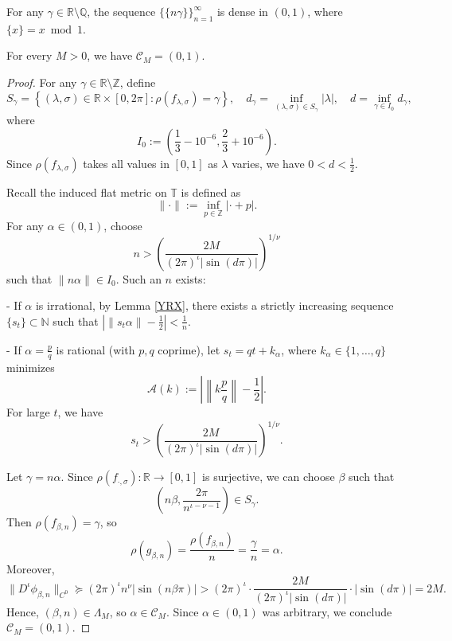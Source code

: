 \documentclass[10pt,a4paper]{amsart}
\begin{document}
\begin{Lemma} \label{YRX}
For any $\gamma \in \mathbb{R} \setminus \mathbb{Q}$, the sequence $\{\{n\gamma\}\}_{n=1}^{\infty}$ is dense in $(0,1)$, where $\{x\} = x \bmod 1$.
\end{Lemma}

\begin{Proposition} \label{DW}
For every \( M > 0 \), we have \( \mathcal{C}_M = (0,1) \).
\end{Proposition}

\begin{proof}
For any \( \gamma \in \mathbb{R} \setminus \mathbb{Z} \), define
\[
S_\gamma = \left\{ (\lambda, \sigma) \in \mathbb{R} \times [0, 2\pi] : \rho(f_{\lambda,\sigma}) = \gamma \right\}, \quad
d_\gamma = \inf_{(\lambda,\sigma) \in S_\gamma} |\lambda|, \quad
d = \inf_{\gamma \in I_0} d_\gamma,
\]
where
\[
I_0 := \left(\frac{1}{3} - 10^{-6}, \frac{2}{3} + 10^{-6}\right).
\]
Since $\rho(f_{\lambda,\sigma})$ takes all values in $[0,1]$ as $\lambda$ varies, we have \( 0 < d < \frac{1}{2} \).

Recall the induced flat metric on \( \mathbb{T} \) is defined as
\[
\|\cdot\| := \inf_{p \in \mathbb{Z}} |\cdot + p|.
\]
For any \( \alpha \in (0,1) \), choose
\[
n > \left( \frac{2M}{(2\pi)^{\iota} |\sin(d\pi)|} \right)^{1/\nu}
\]
such that $\|n\alpha\| \in I_0$. Such an \( n \) exists:

- If \( \alpha \) is irrational, by Lemma \ref{YRX}, there exists a strictly increasing sequence \( \{s_t\} \subset \mathbb{N} \) such that \( \left| \|s_t \alpha\| - \frac{1}{2} \right| < \frac{1}{n} \).

- If \( \alpha = \frac{p}{q} \) is rational (with \( p, q \) coprime), let \( s_t = q t + k_\alpha \), where \( k_\alpha \in \{1, \dots, q\} \) minimizes
\[
\mathcal{A}(k) := \left| \left\|k \frac{p}{q}\right\| - \frac{1}{2} \right|.
\]
For large \( t \), we have
\[
s_t > \left( \frac{2M}{(2\pi)^{\iota} |\sin(d\pi)|} \right)^{1/\nu}.
\]

Let \( \gamma = n\alpha \). Since $\rho(f_{\cdot,\sigma}): \mathbb{R} \to [0,1]$ is surjective, we can choose \( \beta \) such that
\[
\left(n\beta, \frac{2\pi}{n^{\iota-\nu-1}}\right) \in S_\gamma.
\]
Then \( \rho(f_{\beta,n}) = \gamma \), so
\[
\rho(g_{\beta,n}) = \frac{\rho(f_{\beta,n})}{n} = \frac{\gamma}{n} = \alpha.
\]
Moreover,
\[
\|D^{\iota}\phi_{\beta,n}\|_{C^0} \succcurlyeq (2\pi)^{\iota} n^{\nu} |\sin(n\beta\pi)| > (2\pi)^{\iota} \cdot \frac{2M}{(2\pi)^{\iota} |\sin(d\pi)|} \cdot |\sin(d\pi)| = 2M.
\]
Hence, \( (\beta, n) \in \Lambda_M \), so \( \alpha \in \mathcal{C}_M \). Since \( \alpha \in (0,1) \) was arbitrary, we conclude \( \mathcal{C}_M = (0,1) \).
\end{proof}
\end{document}
